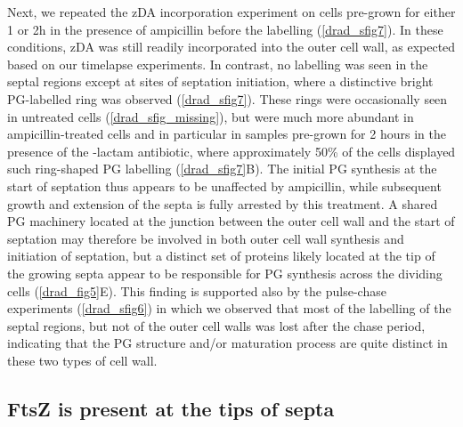 Next, we repeated the zDA incorporation experiment on cells pre-grown for either 1 or 2h in the presence of ampicillin before the labelling (\autoref{drad_sfig7}).
In these conditions, zDA was still readily incorporated into the outer cell wall, as expected based on our timelapse experiments.
In contrast, no labelling was seen in the septal regions except at sites of septation initiation, where a distinctive bright PG-labelled ring was observed (\autoref{drad_sfig7}).
These rings were occasionally seen in untreated cells (\autoref{drad_sfig_missing}), but were much more abundant in ampicillin-treated cells and in particular in samples pre-grown for 2 hours in the presence of the \beta-lactam antibiotic, where approximately 50\% of the cells displayed such ring-shaped PG labelling (\autoref{drad_sfig7}B).
The initial PG synthesis at the start of septation thus appears to be unaffected by ampicillin, while subsequent growth and extension of the septa is fully arrested by this treatment.
A shared PG machinery located at the junction between the outer cell wall and the start of septation may therefore be involved in both outer cell wall synthesis and initiation of septation, but a distinct set of proteins likely located at the tip of the growing septa appear to be responsible for PG synthesis across the dividing cells (\autoref{drad_fig5}E).
This finding is supported also by the pulse-chase experiments (\autoref{drad_sfig6}) in which we observed that most of the labelling of the septal regions, but not of the outer cell walls was lost after the chase period, indicating that the PG structure and/or maturation process are quite distinct in these two types of cell wall.

\FloatBarrier

\subsection{FtsZ is present at the tips of septa}\label{drad_ftsz}

